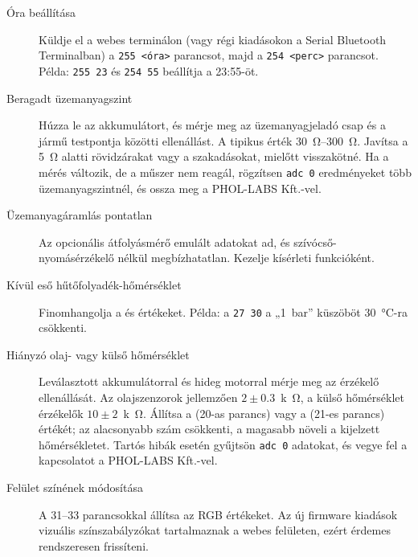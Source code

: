\begin{description}
    \item[Óra beállítása] Küldje el a webes terminálon (vagy régi kiadásokon a Serial Bluetooth Terminalban) a \verb|255 <óra>| parancsot, majd a \verb|254 <perc>| parancsot. Példa: \verb|255 23| és \verb|254 55| beállítja a 23:55-öt.
    \item[Beragadt üzemanyagszint] Húzza le az akkumulátort, és mérje meg az üzemanyagjeladó csap és a jármű testpontja közötti ellenállást. A tipikus érték \SIrange{30}{300}{\ohm}. Javítsa a \SI{5}{\ohm} alatti rövidzárakat vagy a szakadásokat, mielőtt visszakötné. Ha a mérés változik, de a műszer nem reagál, rögzítsen \verb|adc 0| eredményeket több üzemanyagszintnél, és ossza meg a PHOL-LABS Kft.-vel.
    \item[Üzemanyagáramlás pontatlan] Az opcionális átfolyásmérő emulált adatokat ad, és szívócső-nyomásérzékelő nélkül megbízhatatlan. Kezelje kísérleti funkcióként.
    \item[Kívül eső hűtőfolyadék-hőmérséklet] Finomhangolja a  és  értékeket. Példa: a \verb|27 30| a „1~bar” küszöböt \SI{30}{\celsius}-ra csökkenti.
    \item[Hiányzó olaj- vagy külső hőmérséklet] Leválasztott akkumulátorral és hideg motorral mérje meg az érzékelő ellenállását. Az olajszenzorok jellemzően \ensuremath{2\pm0.3}~\si{k\ohm}, a külső hőmérséklet érzékelők \ensuremath{10\pm2}~\si{k\ohm}. Állítsa a  (20-as parancs) vagy a  (21-es parancs) értékét; az alacsonyabb szám csökkenti, a magasabb növeli a kijelzett hőmérsékletet. Tartós hibák esetén gyűjtsön \verb|adc 0| adatokat, és vegye fel a kapcsolatot a PHOL-LABS Kft.-vel.
    \item[Felület színének módosítása] A 31--33 parancsokkal állítsa az RGB értékeket. Az új firmware kiadások vizuális színszabályzókat tartalmaznak a webes felületen, ezért érdemes rendszeresen frissíteni.
\end{description}
